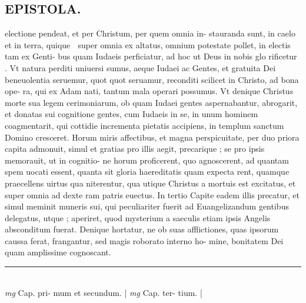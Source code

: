 \documentclass{article}
\begin{document}
\begin{pages}
\section*{EPISTOLA.  }\pstart electione pendeat, et per Christum, per quem omnia in- stauranda sunt, in caelo et in terra, quique  super omnia ex altatus, omnium potestate pollet, in electis tam ex Genti- bus quam Iudaeis perficiatur, ad hoc ut Deus in nobis glo rificetur .  Vt natura perditi uniuersi sumus, aeque Iudaei ac Gentes, et gratuita Dei beneuolentia seruemur, quot quot seruamur, reconditi scilicet in Christo, ad bona ope- ra, qui ex Adam nati, tantum mala operari possumus.  Vt denique  Christus morte sua legem cerimoniarum, ob quam Iudaei gentes aspernabantur, abrogarit, et donatas sui cognitione gentes, cum Iudaeis in se, in unum hominem coagmentarit, qui cottidie incrementa pietatis accipiens, in templum sanctum Domino cresceret.   \pend\pstart Horum miris affectibus, et magna perspicuitate, per duo priora capita admonuit, simul et gratias pro illis aegit, precarique ; se pro ipsis memorauit, ut in cognitio- ne horum proficerent, quo agnoscerent, ad quantam spem uocati essent, quanta sit gloria haereditatis quam expecta rent, quamque  praecellens uirtus qua niterentur, qua utique  Christus a mortuis est excitatus, et super omnia ad dexte ram patris euectus.  In tertio Capite eadem illis precatur, et simul meminit muneris sui, qui peculiariter fuerit ad Euangelizandum gentibus delegatus, utque ; aperiret, quod mysterium a saeculis etiam ipsis Angelis absconditum fuerat.  Denique  hortatur, ne ob suas afflictiones, quas ipsorum caussa ferat, frangantur, sed magis roborato interno ho- mine, bonitatem Dei quam amplissime cognoscant.   \pend
\vspace{0.5cm}\noindent
\vspace{0.2cm}\rule{1cm}{0.2pt}\\ 
\hspace{0.2cm}\textit{mg}
\footnotesize Cap.  pri- mum et secundum.  
\normalsize| 
\hspace{0.2cm}\textit{mg}
\footnotesize Cap.  ter- tium.  
\normalsize| 

\end{pages}
\end{document}
